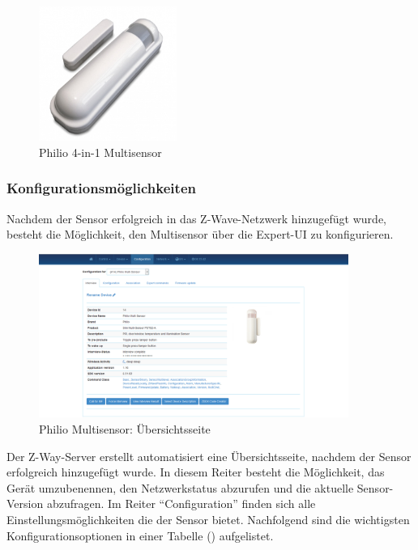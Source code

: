 \begin{figure}[h!]
	\centering
	\includegraphics[width=0.4\textwidth]{img/Sensorevaluation/Philio.jpeg}
	\caption{Philio 4-in-1 Multisensor}
	\label{fig:sensorenPhilioMultisensor}
\end{figure}

\newpage

\subsubsection{Konfigurationsmöglichkeiten}
Nachdem der Sensor erfolgreich in das Z-Wave-Netzwerk hinzugefügt wurde, besteht die Möglichkeit, den Multisensor über die Expert-UI zu konfigurieren.

\begin{figure}[h!]
	\centering
	\includegraphics[width=0.9\textwidth]{img/Sensorevaluation/PhilioConf1.png}
	\caption{Philio Multisensor: Übersichtsseite}
	\label{fig:sensorenPhilioConf1}
\end{figure}

Der Z-Way-Server erstellt automatisiert eine Übersichtsseite, nachdem der Sensor erfolgreich hinzugefügt wurde. In diesem Reiter besteht die Möglichkeit, das Gerät umzubenennen, den Netzwerkstatus abzurufen und die aktuelle Sensor-Version abzufragen. Im Reiter "`Configuration"' finden sich alle Einstellungsmöglichkeiten die der Sensor bietet. Nachfolgend sind die wichtigsten Konfigurationsoptionen in einer Tabelle () aufgelistet.


